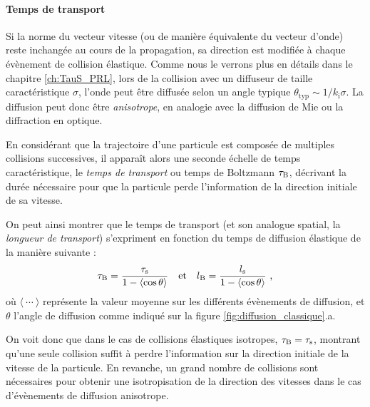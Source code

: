\paragraph*{Temps de transport}
Si la norme du vecteur vitesse (ou de manière équivalente du vecteur d'onde) reste inchangée au cours de la propagation, sa direction est modifiée à chaque évènement de collision élastique. Comme nous le verrons plus en détails dans le chapitre \ref{ch:TauS_PRL}, lors de la collision avec un diffuseur de taille caractéristique $\sigma$, l'onde peut être diffusée selon un angle typique $\theta_{\mathrm{typ}}\sim 1/k_{\mathrm{i}} \sigma$. La diffusion peut donc être \emph{anisotrope}, en analogie avec la diffusion de Mie ou la diffraction en optique.

En considérant que la trajectoire d'une particule est composée de multiples collisions successives, il apparaît alors une seconde échelle de temps caractéristique, le \emph{temps de transport} ou temps de Boltzmann $\tau_{\mathrm{B}}$, décrivant la durée nécessaire pour que la particule perde l'information de la direction initiale de sa vitesse. 


On peut ainsi montrer que le temps de transport (et son analogue spatial, la \emph{longueur de transport}) s'expriment en fonction du temps de diffusion élastique de la manière suivante \citep{akkermans2007mesoscopic}:
\begin{equation}
\tau_{\mathrm{B}}=\frac{\tau_{\mathrm{s}}}{1-\left\langle\cos{\theta}\right\rangle} \quad \text{et} \quad l_{\mathrm{B}}=\frac{l_{\mathrm{s}}}{1-\left\langle\cos{\theta}\right\rangle} \text{ ,}
\label{eq:definition_taub}
\end{equation}
où $\langle\:\cdots\:\rangle$ représente la valeur moyenne sur les différents évènements de diffusion, et $\theta$ l'angle de diffusion comme indiqué sur la figure \ref{fig:diffusion_classique}.a.

On voit donc que dans le cas de collisions élastiques isotropes, $\tau_{\mathrm{B}}=\tau_{\mathrm{s}}$, montrant qu'une seule collision suffit à perdre l'information sur la direction initiale de la vitesse de la particule. En revanche, un grand nombre de collisions sont nécessaires pour obtenir une isotropisation de la direction des vitesses dans le cas d'évènements de diffusion anisotrope.


